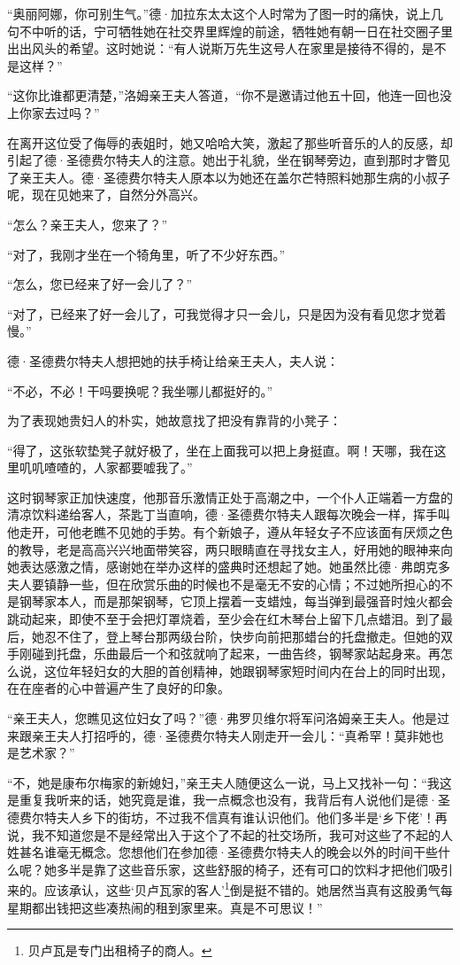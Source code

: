 \par “奥丽阿娜，你可别生气。”德·加拉东太太这个人时常为了图一时的痛快，说上几句不中听的话，宁可牺牲她在社交界里辉煌的前途，牺牲她有朝一日在社交圈子里出出风头的希望。这时她说：“有人说斯万先生这号人在家里是接待不得的，是不是这样？”
\par “这你比谁都更清楚，”洛姆亲王夫人答道，“你不是邀请过他五十回，他连一回也没上你家去过吗？”
\par 在离开这位受了侮辱的表姐时，她又哈哈大笑，激起了那些听音乐的人的反感，却引起了德·圣德费尔特夫人的注意。她出于礼貌，坐在钢琴旁边，直到那时才瞥见了亲王夫人。德·圣德费尔特夫人原本以为她还在盖尔芒特照料她那生病的小叔子呢，现在见她来了，自然分外高兴。
\par “怎么？亲王夫人，您来了？”
\par “对了，我刚才坐在一个犄角里，听了不少好东西。”
\par “怎么，您已经来了好一会儿了？”
\par “对了，已经来了好一会儿了，可我觉得才只一会儿，只是因为没有看见您才觉着慢。”
\par 德·圣德费尔特夫人想把她的扶手椅让给亲王夫人，夫人说：
\par “不必，不必！干吗要换呢？我坐哪儿都挺好的。”
\par 为了表现她贵妇人的朴实，她故意找了把没有靠背的小凳子：
\par “得了，这张软垫凳子就好极了，坐在上面我可以把上身挺直。啊！天哪，我在这里叽叽喳喳的，人家都要嘘我了。”
\par 这时钢琴家正加快速度，他那音乐激情正处于高潮之中，一个仆人正端着一方盘的清凉饮料递给客人，茶匙丁当直响，德·圣德费尔特夫人跟每次晚会一样，挥手叫他走开，可他老瞧不见她的手势。有个新娘子，遵从年轻女子不应该面有厌烦之色的教导，老是高高兴兴地面带笑容，两只眼睛直在寻找女主人，好用她的眼神来向她表达感激之情，感谢她在举办这样的盛典时还想起了她。她虽然比德·弗朗克多夫人要镇静一些，但在欣赏乐曲的时候也不是毫无不安的心情；不过她所担心的不是钢琴家本人，而是那架钢琴，它顶上摆着一支蜡烛，每当弹到最强音时烛火都会跳动起来，即使不至于会把灯罩烧着，至少会在红木琴台上留下几点蜡泪。到了最后，她忍不住了，登上琴台那两级台阶，快步向前把那蜡台的托盘撤走。但她的双手刚碰到托盘，乐曲最后一个和弦就响了起来，一曲告终，钢琴家站起身来。再怎么说，这位年轻妇女的大胆的首创精神，她跟钢琴家短时间内在台上的同时出现，在在座者的心中普遍产生了良好的印象。
\par “亲王夫人，您瞧见这位妇女了吗？”德·弗罗贝维尔将军问洛姆亲王夫人。他是过来跟亲王夫人打招呼的，德·圣德费尔特夫人刚走开一会儿：“真希罕！莫非她也是艺术家？”
\par “不，她是康布尔梅家的新媳妇，”亲王夫人随便这么一说，马上又找补一句：“我这是重复我听来的话，她究竟是谁，我一点概念也没有，我背后有人说他们是德·圣德费尔特夫人乡下的街坊，不过我不信真有谁认识他们。他们多半是‘乡下佬’！再说，我不知道您是不是经常出入于这个了不起的社交场所，我可对这些了不起的人姓甚名谁毫无概念。您想他们在参加德·圣德费尔特夫人的晚会以外的时间干些什么呢？她多半是靠了这些音乐家，这些舒服的椅子，还有可口的饮料才把他们吸引来的。应该承认，这些‘贝卢瓦家的客人’\footnote{贝卢瓦是专门出租椅子的商人。}倒是挺不错的。她居然当真有这股勇气每星期都出钱把这些凑热闹的租到家里来。真是不可思议！”

